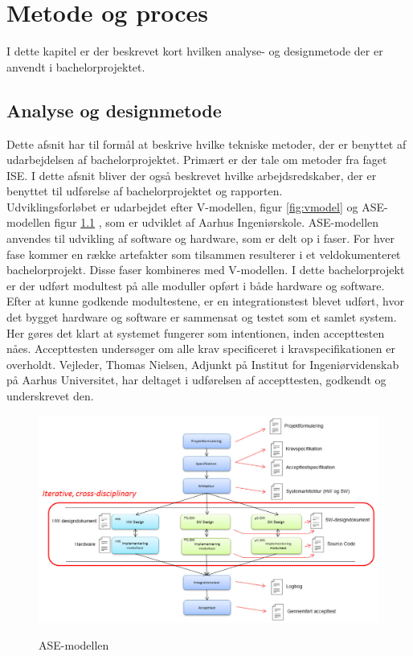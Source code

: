 \chapter{Metode og proces}

I dette kapitel er der beskrevet kort hvilken analyse- og designmetode der er anvendt i bachelorprojektet. 

\section{Analyse og designmetode}

Dette afsnit har til formål at beskrive hvilke tekniske metoder, der er benyttet af udarbejdelsen af bachelorprojektet. Primært er der tale om metoder fra faget ISE. I dette afsnit bliver der også beskrevet hvilke arbejdsredskaber, der er benyttet til udførelse af bachelorprojektet og rapporten.\\

Udviklingsforløbet er udarbejdet efter V-modellen, figur \ref{fig:vmodel} og ASE-modellen figur \ref{fig:asemodel} \cite{IngeniorhojskolenAarhusUniversiteta}, som er udviklet af Aarhus Ingeniørskole. ASE-modellen anvendes til udvikling af software og hardware, som er delt op i faser. For hver fase kommer en række artefakter som tilsammen resulterer i et veldokumenteret bachelorprojekt. Disse faser kombineres med V-modellen. I dette bachelorprojekt er der udført modultest på alle moduller opført i både hardware og software. Efter at kunne godkende modultestene, er en integrationstest blevet udført, hvor det bygget hardware og software er sammensat og testet som et samlet system. Her gøres det klart at systemet fungerer som intentionen, inden accepttesten nåes. Accepttesten undersøger om alle krav specificeret i kravspecifikationen er overholdt. Vejleder, Thomas Nielsen, Adjunkt på Institut for Ingeniørvidenskab på Aarhus Universitet, har deltaget i udførelsen af accepttesten, godkendt og underskrevet den. 

\begin{figure}[H]
\centering
{\includegraphics[width=\textwidth]
{Figure/asemodel}}
\caption{ASE-modellen\cite{IngeniorhojskolenAarhusUniversiteta}}
\label{fig:asemodel}
\end{figure}

